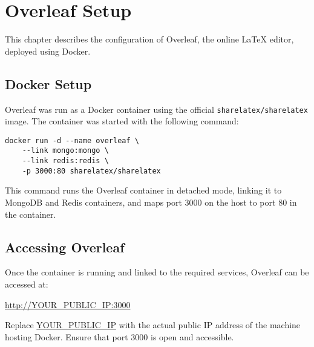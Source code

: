 \chapter{Overleaf Setup}
\label{ch:overleaf}

This chapter describes the configuration of Overleaf, the online LaTeX editor, deployed using Docker.

\section{Docker Setup}

Overleaf was run as a Docker container using the official \texttt{sharelatex/sharelatex} image. The container was started with the following command:

\begin{verbatim}
docker run -d --name overleaf \
    --link mongo:mongo \
    --link redis:redis \
    -p 3000:80 sharelatex/sharelatex
\end{verbatim}

This command runs the Overleaf container in detached mode, linking it to MongoDB and Redis containers, and maps port 3000 on the host to port 80 in the container.

\section{Accessing Overleaf}

Once the container is running and linked to the required services, Overleaf can be accessed at:

\begin{center}
\url{http://YOUR_PUBLIC_IP:3000}
\end{center}

Replace \url{YOUR_PUBLIC_IP} with the actual public IP address of the machine hosting Docker. Ensure that port 3000 is open and accessible.

